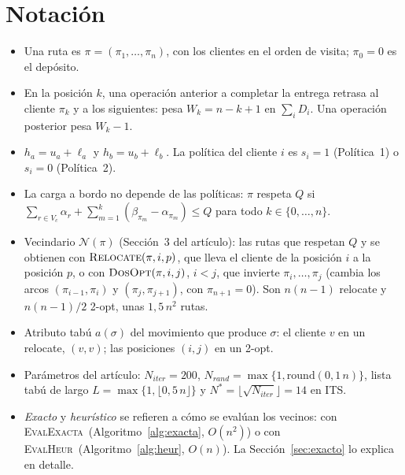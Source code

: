 \documentclass{article}
\newcommand{\EvalE}{\mbox{\textsc{EvalExacta}}}
\newcommand{\EvalH}{\mbox{\textsc{EvalHeur}}}
\newcommand{\Niter}{N_{\mathit{iter}}}
\newcommand{\Nrand}{N_{\mathit{rand}}}
\begin{document}
\section{Notación}

\begin{itemize}[leftmargin=*]
    \item Una ruta es $\pi = (\pi_1,\dots,\pi_n)$, con los clientes en el orden de visita; $\pi_0 = 0$ es el depósito.
    \item En la posición $k$, una operación anterior a completar la entrega retrasa al cliente $\pi_k$ y a los siguientes: pesa $W_k = n - k + 1$ en $\sum_i D_i$. Una operación posterior pesa $W_k - 1$.
    \item $h_a = u_a + \ell_a$ y $h_b = u_b + \ell_b$. La política del cliente $i$ es $s_i = 1$ (Política~1) o $s_i = 0$ (Política~2).
    \item La carga a bordo no depende de las políticas: $\pi$ respeta $Q$ si $\sum_{r \in V_c} \alpha_r + \sum_{m=1}^{k} (\beta_{\pi_m} - \alpha_{\pi_m}) \le Q$ para todo $k \in \{0,\dots,n\}$.
    \item Vecindario $\mathcal{N}(\pi)$ (Sección~3 del artículo): las rutas que respetan $Q$ y se obtienen con
          $\textsc{Relocate}(\pi, i, p)$, que lleva el cliente de la posición $i$ a la posición $p$, o con
          $\textsc{DosOpt}(\pi, i, j)$, $i < j$, que invierte $\pi_i,\dots,\pi_j$ (cambia los arcos $(\pi_{i-1}, \pi_i)$ y $(\pi_j, \pi_{j+1})$, con $\pi_{n+1} = 0$). Son $n(n-1)$ relocate y $n(n-1)/2$ 2-opt, unas $1{,}5\,n^2$ rutas.
    \item Atributo tabú $a(\sigma)$ del movimiento que produce $\sigma$: el cliente $v$ en un relocate, $(v, v)$; las posiciones $(i, j)$ en un 2-opt.
    \item Parámetros del artículo: $\Niter = 200$, $\Nrand = \max\{1, \mathrm{round}(0{,}1\,n)\}$, lista tabú de largo $L = \max\{1, \lfloor 0{,}5\,n \rfloor\}$ y $N^* = \lfloor \sqrt{\Niter} \rfloor = 14$ en ITS.
    \item \emph{Exacto} y \emph{heurístico} se refieren a cómo se evalúan los vecinos: con \EvalE\ (Algoritmo~\ref{alg:exacta}, $O(n^2)$) o con \EvalH\ (Algoritmo~\ref{alg:heur}, $O(n)$). La Sección~\ref{sec:exacto} lo explica en detalle.
\end{itemize}

\end{document}
